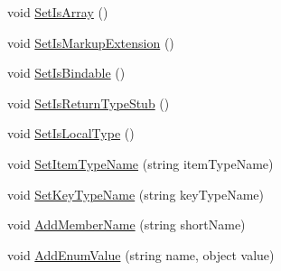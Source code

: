 \begin{CompactItemize}
\item 
void \hyperlink{class__2doo_1_1_u_w_p_1_1__2doo___u_w_p___xaml_type_info_1_1_xaml_user_type_1722baba0e95ddab78158a481a521c82}{SetIsArray} ()
\item 
void \hyperlink{class__2doo_1_1_u_w_p_1_1__2doo___u_w_p___xaml_type_info_1_1_xaml_user_type_8ae2d3db19d65a69ff1e47e23c537b02}{SetIsMarkupExtension} ()
\item 
void \hyperlink{class__2doo_1_1_u_w_p_1_1__2doo___u_w_p___xaml_type_info_1_1_xaml_user_type_e232c70ba93a8c450bfb05fdaa05df94}{SetIsBindable} ()
\item 
void \hyperlink{class__2doo_1_1_u_w_p_1_1__2doo___u_w_p___xaml_type_info_1_1_xaml_user_type_99d5ee2db16e8878f331ccf7041207d9}{SetIsReturnTypeStub} ()
\item 
void \hyperlink{class__2doo_1_1_u_w_p_1_1__2doo___u_w_p___xaml_type_info_1_1_xaml_user_type_1d54e22f428a9af1404131208bd557aa}{SetIsLocalType} ()
\item 
void \hyperlink{class__2doo_1_1_u_w_p_1_1__2doo___u_w_p___xaml_type_info_1_1_xaml_user_type_464ce62bb06bb7060368a09abc2fa853}{SetItemTypeName} (string itemTypeName)
\item 
void \hyperlink{class__2doo_1_1_u_w_p_1_1__2doo___u_w_p___xaml_type_info_1_1_xaml_user_type_25064818473158164ab03231c1995152}{SetKeyTypeName} (string keyTypeName)
\item 
void \hyperlink{class__2doo_1_1_u_w_p_1_1__2doo___u_w_p___xaml_type_info_1_1_xaml_user_type_9097b2fedb19d90ef7bc1f7242357cba}{AddMemberName} (string shortName)
\item 
void \hyperlink{class__2doo_1_1_u_w_p_1_1__2doo___u_w_p___xaml_type_info_1_1_xaml_user_type_976877b61c19a9ad4723b034934a4e70}{AddEnumValue} (string name, object value)
\end{CompactItemize}
